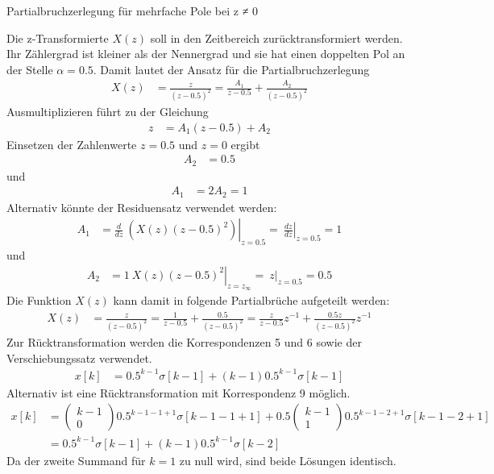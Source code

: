 \begin{example}{Partialbruchzerlegung für mehrfache Pole bei z ≠ 0}
\label{example:beispiel-partialbruchzerlegung-fuxfcr-mehrfache-pole-bei-z-0}

Die z-Transformierte \(X(z)\) soll in den Zeitbereich zurücktransformiert werden. Ihr Zählergrad ist kleiner als der Nennergrad und sie hat einen doppelten Pol an der Stelle \(α = 0.5\). Damit lautet der Ansatz für die Partialbruchzerlegung
\begin{align*}
X(z) &= \frac{z}{(z - 0.5)^{2}} = \frac{A_{1}}{z - 0.5} + \frac{A_{2}}{(z - 0.5)^{2}} 
\end{align*}
Ausmultiplizieren führt zu der Gleichung
\begin{align*}
z &= A_{1}  (z - 0.5) + A_{2} 
\end{align*}
Einsetzen der Zahlenwerte \(z = 0.5\) und \(z = 0\) ergibt
\begin{align*}
A_{2} &= 0.5 
\end{align*}
und
\begin{align*}
A_{1} &= 2  A_{2} = 1 
\end{align*}
Alternativ könnte der Residuensatz verwendet werden:
\begin{align*}
A_{1} &= \frac{d}{dz}\left. \ \left( X(z)  (z - 0.5)^{2} \right) \right|_{z = 0.5} = \left. \ \frac{dz}{dz} \right|_{z = 0.5} = 1 
\end{align*}
und
\begin{align*}
A_{2} &= 1  \left. \ X(z)  (z - 0.5)^{2} \right|_{z = z_{\infty}} = \left. \ z \right|_{z = 0.5} = 0.5 
\end{align*}
Die Funktion \(X(z)\) kann damit in folgende Partialbrüche aufgeteilt werden:
\begin{align*}
X(z) &= \frac{z}{(z - 0.5)^{2}} = \frac{1}{z - 0.5} + \frac{0.5}{(z - 0.5)^{2}} = \frac{z}{z - 0.5}  z^{- 1} + \frac{0.5  z}{(z - 0.5)^{2}}  z^{- 1} 
\end{align*}
Zur Rücktransformation werden die Korrespondenzen 5 und 6 sowie der Verschiebungssatz verwendet.
\begin{align*}
x[ k] &= 0.5^{k - 1}  \sigma[ k - 1] + (k - 1)  0.5^{k - 1}  \sigma[ k - 1] 
\end{align*}
Alternativ ist eine Rücktransformation mit Korrespondenz 9 möglich.
\begin{align*}
{x\left[k\right]} &=  {\left(\begin{array}{c} {k-1} \\
{0} \end{array}\right) 0.5^{k-1-1+1}  \sigma \left[k-1-1+1\right]+0.5 \left(\begin{array}{c} {k-1} \\
{1} \end{array}\right) 0.5^{k-1-2+1}  \sigma \left[k-1-2+1\right]} \\
{} &=  {0.5^{k-1}  \sigma \left[k-1\right]+(k-1) 0.5^{k-1}  \sigma \left[k-2\right]}
\end{align*}
Da der zweite Summand für \(k = 1\) zu null wird, sind beide Lösungen identisch.

\end{example}

